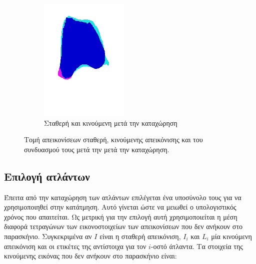 \documentclass[a4paper,12pt]{article}
\begin{document}
\begin{figure}[H]
    \begin{subfigure}[t]{0.4\linewidth}
    \includegraphics[width=\linewidth]{combination_label_after_registration_3.png}
    \caption{Σταθερή και κινούμενη μετά την καταχώρηση}
    \end{subfigure}

    \caption{Τομή απεικονίσεων σταθερή, κινούμενης απεικόνισης και του
             συνδυασμού τους μετά την μετά την καταχώρηση.}
    \label{fig:registration_after:3}
\end{figure}


\subsection{Επιλογή ατλάντων}

Έπειτα από την καταχώρηση των ατλάντων επιλέγεται ένα υποσύνολο τους για να
χρησιμοποιηθεί στην κατάτμηση. Αυτό γίνεται ώστε να μειωθεί ο υπολογιστικός
χρόνος που απαιτείται. Ως μετρική για την επιλογή αυτή χρησιμοποιείται η μέση
διαφορά τετραγώνων των εικονοστοιχείων των απεικονίσεων που δεν ανήκουν στο
παρασκήνιο.  Συγκεκριμένα αν $I$ είναι η σταθερή απεικόνιση, $I_i$ και $L_i$ μία
κινούμενη απεικόνιση και οι ετικέτες της αντίστοιχα για τον $i$-οστό άτλαντα. Τα
στοιχεία της κινούμενης εικόνας που δεν ανήκουν στο παρασκήνιο είναι:
\end{document}
